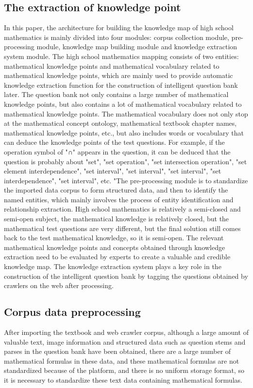 \subsection{The extraction of knowledge point}
In this paper, the architecture for building the knowledge map of high school mathematics is mainly divided into four modules: corpus collection module, pre-processing module, knowledge map building module and knowledge extraction system module. The high school mathematics mapping consists of two entities: mathematical knowledge points and mathematical vocabulary related to mathematical knowledge points, which are mainly used to provide automatic knowledge extraction function for the construction of intelligent question bank later. The question bank not only contains a large number of mathematical knowledge points, but also contains a lot of mathematical vocabulary related to mathematical knowledge points. The mathematical vocabulary does not only stop at the mathematical concept ontology, mathematical textbook chapter names, mathematical knowledge points, etc., but also includes words or vocabulary that can deduce the knowledge points of the test questions. For example, if the operation symbol of "∩" appears in the question, it can be deduced that the question is probably about "set", "set operation", "set intersection operation", "set element interdependence", "set interval", "set interval", "set interval", "set interdependence", "set interval", etc. "The pre-processing module is to standardize the imported data corpus to form structured data, and then to identify the named entities, which mainly involves the process of entity identification and relationship extraction. High school mathematics is relatively a semi-closed and semi-open subject, the mathematical knowledge is relatively closed, but the mathematical test questions are very different, but the final solution still comes back to the test mathematical knowledge, so it is semi-open. The relevant mathematical knowledge points and concepts obtained through knowledge extraction need to be evaluated by experts to create a valuable and credible knowledge map. The knowledge extraction system plays a key role in the construction of the intelligent question bank by tagging the questions obtained by crawlers on the web after processing. 

\subsection{Corpus data preprocessing}
After importing the textbook and web crawler corpus, although a large amount of valuable text, image information and structured data such as question stems and parses in the question bank have been obtained, there are a large number of mathematical formulas in these data, and these mathematical formulas are not standardized because of the platform, and there is no uniform storage format, so it is necessary to standardize these text data containing mathematical formulas.



